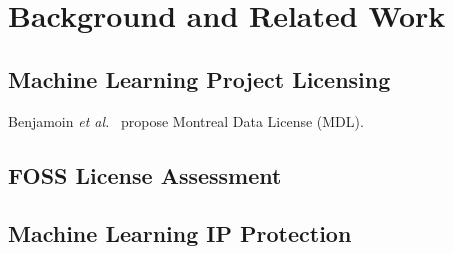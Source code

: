 \section{Background and Related Work}

\subsection{Machine Learning Project Licensing}

Benjamoin \textit{et al.}~\cite{benjamin2019towards} propose Montreal Data License (MDL).

\subsection{FOSS License Assessment}

\subsection{Machine Learning IP Protection}
